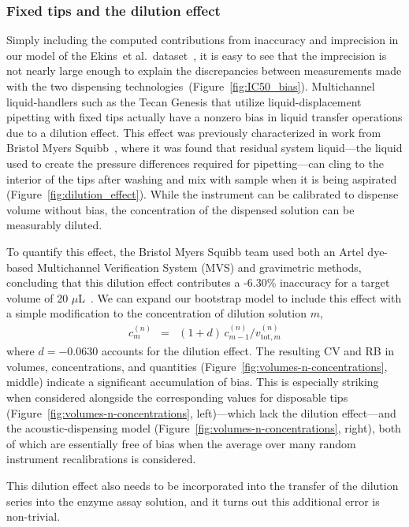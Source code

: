 \documentclass[aps,pre,twocolumn,nofootinbib,superscriptaddress,linenumbers]{revtex4-1}
\begin{document}
\subsubsection*{Fixed tips and the dilution effect}

Simply including the computed contributions from inaccuracy and imprecision in our model of the  Ekins~et al.~dataset~\cite{ekins_dispensing_2013}, it is easy to see that the imprecision is not nearly large enough to explain the discrepancies between measurements made with the two dispensing technologies~(Figure~\ref{fig:IC50_bias}).
Multichannel liquid-handlers such as the Tecan Genesis that utilize liquid-displacement pipetting with fixed tips actually have a nonzero bias in liquid transfer operations due to a dilution effect. 
This effect was previously characterized in work from Bristol Myers Squibb~\cite{dong_use_2006,gu_dilution_2007}, where it was found that residual system liquid---the liquid used to create the pressure differences required for pipetting---can cling to the interior of the tips after washing and mix with sample when it is being aspirated (Figure~\ref{fig:dilution_effect}). 
While the instrument can be calibrated to dispense volume without bias, the concentration of the dispensed solution can be measurably diluted.

To quantify this effect, the Bristol Myers Squibb team used both an Artel dye-based Multichannel Verification System (MVS) and gravimetric methods, concluding that this dilution effect contributes a -6.30\% inaccuracy for a target volume of 20 $\mu$L~\cite{dong_use_2006}.
We can expand our bootstrap model to include this effect with a simple modification to the concentration of dilution solution $m$,
\begin{eqnarray}
c_m^{(n)} &=& (1 + d) \, c_{m-1}^{(n)} / v_{\mathrm{tot},m}^{(n)}
\end{eqnarray}
where $d = -0.0630$ accounts for the dilution effect.
The resulting CV and RB in volumes, concentrations, and quantities (Figure~\ref{fig:volumes-n-concentrations}, middle) indicate a significant accumulation of bias.
This is especially striking when considered alongside the corresponding values for disposable tips (Figure~\ref{fig:volumes-n-concentrations}, left)---which lack the dilution effect---and the acoustic-dispensing model (Figure~\ref{fig:volumes-n-concentrations}, right), both of which are essentially free of bias when the average over many random instrument recalibrations is considered.

This dilution effect also needs to be incorporated into the transfer of the dilution series into the enzyme assay solution, and it turns out this additional error is non-trivial.
\end{document}
